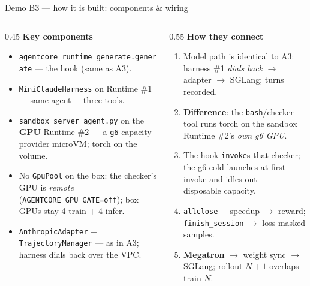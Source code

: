 \documentclass[aspectratio=169]{beamer}
\begin{document}
\begin{frame}{Demo B3 --- how it is built: components \& wiring}
  \begin{columns}[T]
    \begin{column}{0.45\textwidth}
      \scriptsize\textbf{Key components}
      \begin{itemize}\setlength\itemsep{0.15em}
        \item \texttt{agentcore\_runtime\_generate.generate} --- the hook (same as A3).
        \item \texttt{MiniClaudeHarness} on Runtime \#1 --- same agent + three tools.
        \item \texttt{sandbox\_server\_agent.py} on the \textbf{GPU} Runtime \#2 --- a \texttt{g6} capacity-provider microVM; torch on the volume.
        \item No \texttt{GpuPool} on the box: the checker's GPU is \emph{remote} (\texttt{AGENTCORE\_GPU\_GATE=off}); box GPUs stay 4 train + 4 infer.
        \item \texttt{AnthropicAdapter} + \texttt{TrajectoryManager} --- as in A3; harness dials back over the VPC.
      \end{itemize}
    \end{column}
    \begin{column}{0.55\textwidth}
      \scriptsize\textbf{How they connect}
      \begin{enumerate}\setlength\itemsep{0.15em}
        \item Model path is identical to A3: harness \#1 \emph{dials back} $\to$ adapter $\to$ SGLang; turns recorded.
        \item \textbf{Difference}: the \texttt{bash}/checker tool runs torch on the sandbox Runtime \#2's \emph{own g6 GPU}.
        \item The hook \texttt{invoke}s that checker; the g6 cold-launches at first invoke and idles out --- disposable capacity.
        \item \texttt{allclose} + speedup $\to$ reward; \texttt{finish\_session} $\to$ loss-masked samples.
        \item \textbf{Megatron} $\to$ weight sync $\to$ SGLang; rollout $N{+}1$ overlaps train $N$.
      \end{enumerate}
    \end{column}
  \end{columns}
\end{frame}
\end{document}
